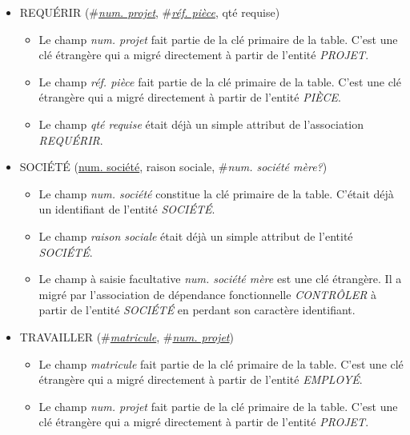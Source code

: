 \documentclass[a4paper]{article}
\newcommand{\relat}[1]{\textsc{#1}}
\newcommand{\attr}[1]{#1}
\newcommand{\prim}[1]{\uline{#1}}
\newcommand{\foreign}[1]{\#\textsl{#1}}
\begin{document}
\begin{itemize}
  \item \relat{REQUÉRIR} (\foreign{\prim{num. projet}}, \foreign{\prim{réf. pièce}}, \attr{qté requise})
  \begin{itemize}
    \item Le champ \emph{num. projet} fait partie de la clé primaire de la table. C'est une clé étrangère qui a migré directement à partir de l'entité \emph{PROJET}.
    \item Le champ \emph{réf. pièce} fait partie de la clé primaire de la table. C'est une clé étrangère qui a migré directement à partir de l'entité \emph{PIÈCE}.
    \item Le champ \emph{qté requise} était déjà un simple attribut de l'association \emph{REQUÉRIR}.
  \end{itemize}

  \item \relat{SOCIÉTÉ} (\prim{num. société}, \attr{raison sociale}, \foreign{num. société mère?})
  \begin{itemize}
    \item Le champ \emph{num. société} constitue la clé primaire de la table. C'était déjà un identifiant de l'entité \emph{SOCIÉTÉ}.
    \item Le champ \emph{raison sociale} était déjà un simple attribut de l'entité \emph{SOCIÉTÉ}.
    \item Le champ à saisie facultative \emph{num. société mère} est une clé étrangère. Il a migré par l'association de dépendance fonctionnelle \emph{CONTRÔLER} à partir de l'entité \emph{SOCIÉTÉ} en perdant son caractère identifiant.
  \end{itemize}

  \item \relat{TRAVAILLER} (\foreign{\prim{matricule}}, \foreign{\prim{num. projet}})
  \begin{itemize}
    \item Le champ \emph{matricule} fait partie de la clé primaire de la table. C'est une clé étrangère qui a migré directement à partir de l'entité \emph{EMPLOYÉ}.
    \item Le champ \emph{num. projet} fait partie de la clé primaire de la table. C'est une clé étrangère qui a migré directement à partir de l'entité \emph{PROJET}.
  \end{itemize}

\end{itemize}
\end{document}
